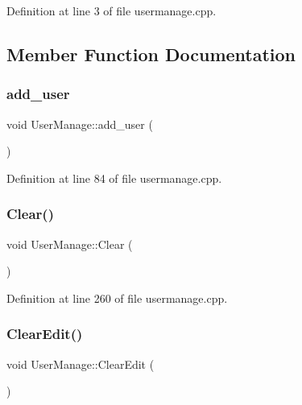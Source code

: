 Definition at line 3 of file usermanage.\+cpp.



\subsection{Member Function Documentation}
\mbox{\label{class_user_manage_a7058bbb981e4c6b3064c3e5e334ac700}} 
\subsubsection{\texorpdfstring{add\_user}{add\_user}}
{\footnotesize\ttfamily void User\+Manage\+::add\+\_\+user (\begin{DoxyParamCaption}{ }\end{DoxyParamCaption})\hspace{0.3cm}{\ttfamily [slot]}}



Definition at line 84 of file usermanage.\+cpp.

\mbox{\label{class_user_manage_af3849a855fdde995372d3162fb358472}} 
\subsubsection{\texorpdfstring{Clear()}{Clear()}}
{\footnotesize\ttfamily void User\+Manage\+::\+Clear (\begin{DoxyParamCaption}{ }\end{DoxyParamCaption})}



Definition at line 260 of file usermanage.\+cpp.

\mbox{\label{class_user_manage_afe9919891a0c86cb075ddb9bc12b2be6}} 
\subsubsection{\texorpdfstring{ClearEdit()}{ClearEdit()}}
{\footnotesize\ttfamily void User\+Manage\+::\+Clear\+Edit (\begin{DoxyParamCaption}{ }\end{DoxyParamCaption})}



